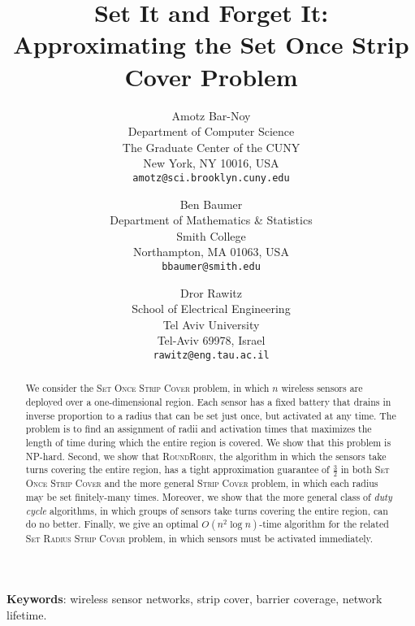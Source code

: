 \documentclass[11pt]{article}
\newcommand{\threehalves}{\frac{3}{2}}
\newcommand{\strip}{\textsc{Strip Cover}\xspace}
\newcommand{\sosclong}{\textsc{Set Once Strip Cover}\xspace}
\newcommand{\srsclong}{\textsc{Set Radius Strip Cover}\xspace}
\newcommand{\rr}{\textsc{RoundRobin}\xspace}
\begin{document}
\title{\bf Set It and Forget It: \\
Approximating the Set Once Strip Cover Problem}

\author{Amotz Bar-Noy \\
Department of Computer Science \\
The Graduate Center of the CUNY \\
New York, NY 10016, USA \\
\texttt{amotz@sci.brooklyn.cuny.edu}
\and
Ben Baumer \\
Department of Mathematics \& Statistics \\
Smith College \\
Northampton, MA 01063, USA \\
\texttt{bbaumer@smith.edu}
\and
Dror Rawitz \\
School of Electrical Engineering \\
Tel Aviv University \\
Tel-Aviv 69978, Israel \\
\texttt{rawitz@eng.tau.ac.il}
}



\begin{titlepage}

\maketitle

\begin{abstract}
We consider the \sosclong problem, in which $n$ wireless sensors are
deployed over a one-dimensional region. Each sensor has a fixed
battery that drains in inverse proportion to a radius that can be set
just once, but activated at any time.  The problem is to find an
assignment of radii and activation times that maximizes the length of
time during which the entire region is covered.  We show that this
problem is NP-hard. Second, we show that \rr, the algorithm in which
the sensors take turns covering the entire region, has a tight
approximation guarantee of $\threehalves$ in both \sosclong and the
more general \strip problem, in which each radius may be set
finitely-many times. Moreover, we show that the more general class of
\emph{duty cycle} algorithms, in which groups of sensors take turns
covering the entire region, can do no better. Finally, we give an
optimal $O(n^2 \log{n})$-time algorithm for the related \srsclong
problem, in which sensors must be activated immediately.
\end{abstract}



\medskip
\noindent
\textbf{Keywords}:
wireless sensor networks,
strip cover,
barrier coverage,
network lifetime.

\thispagestyle{empty}
\end{titlepage}
\end{document}
